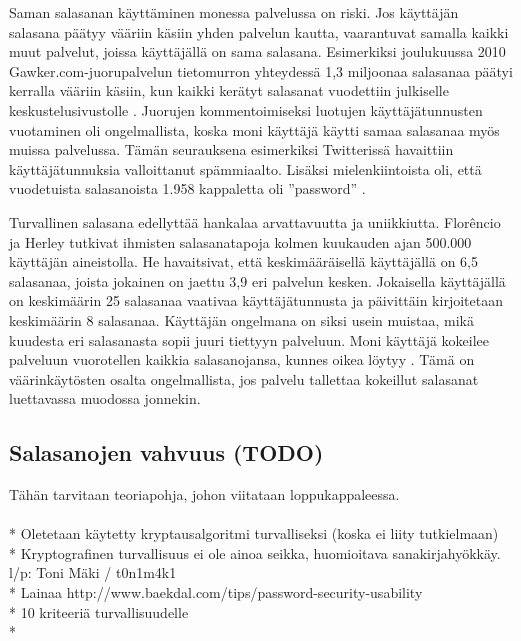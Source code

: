 \documentclass[english,gradu]{tktltiki}
\begin{document}
Saman salasanan käyttäminen monessa palvelussa on riski. Jos käyttäjän salasana päätyy vääriin käsiin yhden palvelun kautta, vaarantuvat samalla kaikki muut palvelut, joissa käyttäjällä on sama salasana. Esimerkiksi joulukuussa 2010 Gawker.com-juorupalvelun tietomurron yhteydessä 1,3 miljoonaa salasanaa päätyi kerralla vääriin käsiin, kun kaikki kerätyt salasanat vuodettiin julkiselle keskustelusivustolle \cite{bbc_gawker_12_2010, forbes_gawker_12_2010}. Juorujen kommentoimiseksi luotujen käyttäjätunnusten vuotaminen oli ongelmallista, koska moni käyttäjä käytti samaa salasanaa myös muissa palvelussa. Tämän seurauksena esimerkiksi Twitterissä havaittiin käyttäjätunnuksia valloittanut spämmiaalto. Lisäksi mielenkiintoista oli, että vuodetuista salasanoista 1.958 kappaletta oli ''password'' \cite{forbes_gawker_12_2010}.

Turvallinen salasana edellyttää hankalaa arvattavuutta ja uniikkiutta. Florêncio ja Herley \cite{study_of_passwords_07} tutkivat ihmisten salasanatapoja kolmen kuukauden ajan 500.000 käyttäjän aineistolla. He havaitsivat, että keskimääräisellä käyttäjällä on 6,5 salasanaa, joista jokainen on jaettu 3,9 eri palvelun kesken. Jokaisella käyttäjällä on keskimäärin 25 salasanaa vaativaa käyttäjätunnusta ja päivittäin kirjoitetaan keskimäärin 8 salasanaa. Käyttäjän ongelmana on siksi usein muistaa, mikä kuudesta eri salasanasta sopii juuri tiettyyn palveluun. Moni käyttäjä kokeilee palveluun vuorotellen kaikkia salasanojansa, kunnes oikea löytyy \cite{study_of_passwords_07}. Tämä on väärinkäytösten osalta ongelmallista, jos palvelu tallettaa kokeillut salasanat luettavassa muodossa jonnekin.




\subsection{Salasanojen vahvuus (TODO)} %
\label{sub:salasanojen_vahvuus_todo_}


Tähän tarvitaan teoriapohja, johon viitataan loppukappaleessa.
 \\
 \\ * Oletetaan käytetty kryptausalgoritmi turvalliseksi (koska ei liity tutkielmaan)
 \\ * Kryptografinen turvallisuus ei ole ainoa seikka, huomioitava sanakirjahyökkäy. l/p: Toni Mäki / t0n1m4k1
 \\ * Lainaa http://www.baekdal.com/tips/password-security-usability
 \\ * 10 kriteeriä turvallisuudelle \cite{schneier_password_advice_09}
 \\ *
\end{document}
